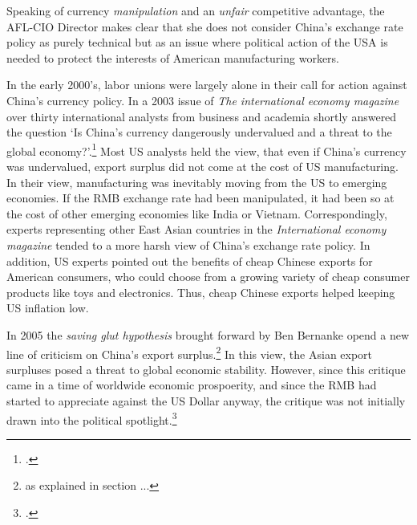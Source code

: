 Speaking of currency \emph{manipulation} and an \emph{unfair} competitive advantage, the AFL-CIO Director makes clear that she does not consider China's exchange rate policy as purely technical but as an issue where political action of the USA is needed to protect the interests of American manufacturing workers.

In the early 2000's, labor unions were largely alone in their call for 
action against China's currency policy. In a 2003 issue of \emph{The 
international economy magazine} over thirty international analysts from 
business and academia shortly answered the question `Is China's currency 
dangerously undervalued and a threat to the global 
economy?'.\footnote{\cite{IEM2003}.}
Most US analysts held the view, that even if China's currency was 
undervalued, export surplus did not come at the cost of US 
manufacturing. In their view, manufacturing was inevitably moving from 
the US to emerging economies. If the RMB exchange rate had been 
manipulated, it had been so at the cost of other emerging economies like 
India or Vietnam. Correspondingly, experts representing other East Asian 
countries in the \emph{International economy magazine} tended to a more 
harsh view of China's exchange rate policy. In addition, US experts 
pointed out the benefits of cheap Chinese exports for American 
consumers, who could choose from a growing variety of cheap consumer 
products like toys and electronics. Thus, cheap Chinese exports helped 
keeping US inflation low.

In 2005 the \emph{saving glut hypothesis} brought forward by Ben 
Bernanke opend a new line of criticism on China's export 
surplus.\footnote{as explained in section ...} %
In this view, the Asian export surpluses posed a threat to global 
economic stability. However, since this critique came in a time of 
worldwide economic prospoerity, and since the RMB had started to 
appreciate against the US Dollar anyway, the critique was not initially 
drawn into the political spotlight.\footnote{\cite[p.16]{Levy2010}.}

